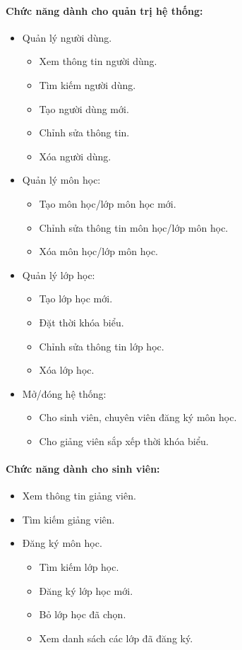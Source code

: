 \documentclass[12pt]{book}
\begin{document}
    \paragraph{Chức năng dành cho quản trị hệ thống:}
    \begin{itemize}
      \item Quản lý người dùng.
      \begin{itemize}
        \item Xem thông tin người dùng.
        \item Tìm kiếm người dùng.
        \item Tạo người dùng mới.
        \item Chỉnh sửa thông tin.
        \item Xóa người dùng.
      \end{itemize}
      \item Quản lý môn học:
      \begin{itemize}
        \item Tạo môn học/lớp môn học mới.
        \item Chỉnh sửa thông tin môn học/lớp môn học.
        \item Xóa môn học/lớp môn học.
      \end{itemize}
      \item Quản lý lớp học:
      \begin{itemize}
        \item Tạo lớp học mới.
        \item Đặt thời khóa biểu.
        \item Chỉnh sửa thông tin lớp học.
        \item Xóa lớp học.
      \end{itemize}
      \item Mở/đóng hệ thống:
      \begin{itemize}
        \item Cho sinh viên, chuyên viên đăng ký môn học.
        \item Cho giảng viên sắp xếp thời khóa biểu.
      \end{itemize}
    \end{itemize}

    \paragraph{Chức năng dành cho sinh viên:}
    \begin{itemize}
      \item Xem thông tin giảng viên.
      \item Tìm kiếm giảng viên.
      \item Đăng ký môn học.
      \begin{itemize}
        \item Tìm kiếm lớp học.
        \item Đăng ký lớp học mới.
        \item Bỏ lớp học đã chọn.
        \item Xem danh sách các lớp đã đăng ký.
      \end{itemize}
    \end{itemize}
\end{document}
